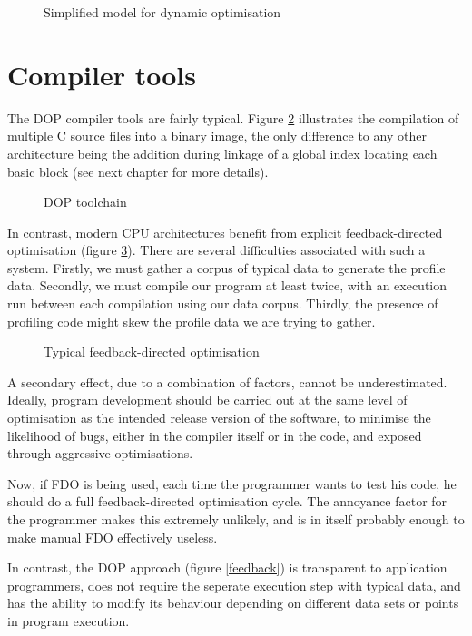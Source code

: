 \begin{figure}[tmb]
\centerline{}
\caption{\label{runtime4}Simplified model for dynamic optimisation}
\end{figure}

\section{Compiler tools}

The DOP compiler tools are fairly typical. Figure \ref{toolchain} illustrates the compilation of multiple C source files into a binary image, the only difference to any other architecture being the addition during linkage of a global index locating each basic block (see next chapter for more details).

\begin{figure}[tmb]
\centerline{}
\caption{\label{toolchain}DOP toolchain}
\end{figure}

In contrast, modern CPU architectures benefit from explicit feedback-directed optimisation (figure \ref{fdo}). There are several difficulties associated with such a system. Firstly, we must gather a corpus of typical data to generate the profile data. Secondly, we must compile our program at least twice, with an execution run between each compilation using our data corpus. Thirdly, the presence of profiling code might skew the profile data we are trying to gather.

\begin{figure}[tmb]
\centerline{}
\caption{\label{fdo}Typical feedback-directed optimisation}
\end{figure}

A secondary effect, due to a combination of factors, cannot be underestimated. Ideally, program development should be carried out at the same level of optimisation as the intended release version of the software, to minimise the likelihood of bugs, either in the compiler itself or in the code, and exposed through aggressive optimisations.

Now, if FDO is being used, each time the programmer wants to test his code, he should do a full feedback-directed optimisation cycle. The annoyance factor for the programmer makes this extremely unlikely, and is in itself probably enough to make manual FDO effectively useless.

In contrast, the DOP approach (figure \ref{feedback}) is transparent to application programmers, does not require the seperate execution step with typical data, and has the ability to modify its behaviour depending on different data sets or points in program execution.

